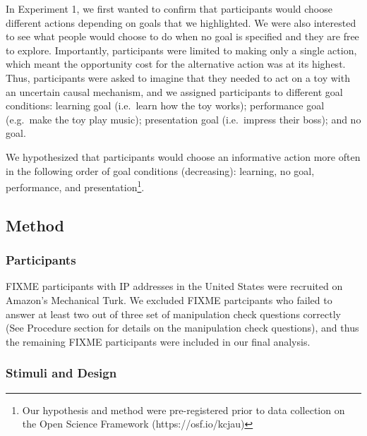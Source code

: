 \documentclass[10pt, letterpaper]{article}
\begin{document}
In Experiment 1, we first wanted to confirm that participants would
choose different actions depending on goals that we highlighted. We were
also interested to see what people would choose to do when no goal is
specified and they are free to explore. Importantly, participants were
limited to making only a single action, which meant the opportunity cost
for the alternative action was at its highest. Thus, participants were
asked to imagine that they needed to act on a toy with an uncertain
causal mechanism, and we assigned participants to different goal
conditions: learning goal (i.e.~learn how the toy works); performance
goal (e.g.~make the toy play music); presentation goal (i.e.~impress
their boss); and no goal.

We hypothesized that participants would choose an informative action
more often in the following order of goal conditions (decreasing):
learning, no goal, performance, and
presentation\footnote{Our hypothesis and method were pre-registered prior to data collection on the Open Science Framework (https://osf.io/kcjau)}.

\subsection{Method}\label{method}

\subsubsection{Participants}\label{participants}

FIXME participants with IP addresses in the United States were recruited
on Amazon's Mechanical Turk. We excluded FIXME partcipants who failed to
answer at least two out of three set of manipulation check questions
correctly (See Procedure section for details on the manipulation check
questions), and thus the remaining FIXME participants were included in
our final analysis.

\subsubsection{Stimuli and Design}\label{stimuli-and-design}
\end{document}
